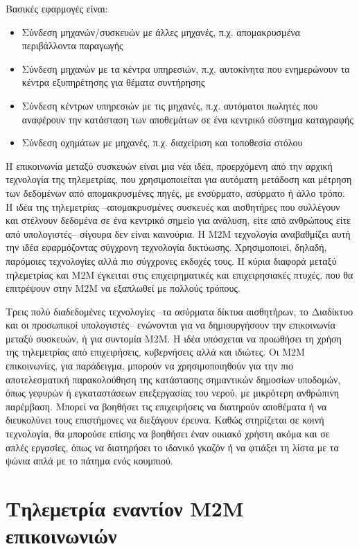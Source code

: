 \documentclass[12pt, a4paper, oneside]{report}
\begin{document}
Βασικές εφαρμογές είναι:
\begin{itemize}
\item Σύνδεση μηχανών\slash συσκευών με άλλες μηχανές, π.χ. απομακρυσμένα περιβάλλοντα παραγωγής
\item Σύνδεση μηχανών με τα κέντρα υπηρεσιών, π.χ. αυτοκίνητα που ενημερώνουν τα κέντρα εξυπηρέτησης για θέματα συντήρησης
\item Σύνδεση κέντρων υπηρεσιών με τις μηχανές, π.χ. αυτόματοι πωλητές που αναφέρουν την κατάσταση των αποθεμάτων σε ένα κεντρικό σύστημα καταγραφής
\item Σύνδεση οχημάτων με μηχανές, π.χ. διαχείριση και τοποθεσία στόλου
\end{itemize}
Η επικοινωνία μεταξύ συσκευών είναι μια νέα ιδέα, προερχόμενη από την αρχική τεχνολογία της τηλεμετρίας, που χρησιμοποιείται για αυτόματη μετάδοση και μέτρηση των δεδομένων από απομακρυσμένες πηγές, με ενσύρματο, ασύρματο ή άλλο τρόπο. Η ιδέα της τηλεμετρίας –απομακρυσμένες συσκευές και αισθητήρες που συλλέγουν και στέλνουν δεδομένα σε ένα κεντρικό σημείο για ανάλυση, είτε από ανθρώπους είτε από υπολογιστές– σίγουρα δεν είναι καινούρια. Η Μ2Μ τεχνολογία αναβαθμίζει αυτή την ιδέα εφαρμόζοντας σύγχρονη τεχνολογία δικτύωσης. Χρησιμοποιεί, δηλαδή, παρόμοιες τεχνολογίες αλλά πιο σύγχρονες εκδοχές τους. Η κύρια διαφορά μεταξύ τηλεμετρίας και Μ2Μ έγκειται στις επιχειρηματικές και επιχειρησιακές πτυχές, που θα επιτρέψουν στην Μ2Μ να εξαπλωθεί με πολλούς τρόπους.

Τρεις πολύ διαδεδομένες τεχνολογίες –τα ασύρματα δίκτυα αισθητήρων, το Διαδίκτυο και οι προσωπικοί υπολογιστές– ενώνονται για να δημιουργήσουν την επικοινωνία μεταξύ συσκευών, ή για συντομία Μ2Μ. Η ιδέα υπόσχεται να προωθήσει τη χρήση της τηλεμετρίας από επιχειρήσεις, κυβερνήσεις αλλά και ιδιώτες. Οι Μ2Μ επικοινωνίες, για παράδειγμα, μπορούν να χρησιμοποιηθούν για την πιο αποτελεσματική παρακολούθηση της κατάστασης σημαντικών δημοσίων υποδομών, όπως γεφυρών ή εγκαταστάσεων επεξεργασίας του νερού, με μικρότερη ανθρώπινη παρέμβαση. Μπορεί να βοηθήσει τις επιχειρήσεις να διατηρούν αποθέματα ή να διευκολύνει τους επιστήμονες να διεξάγουν έρευνα. Καθώς στηρίζεται σε κοινή τεχνολογία, θα μπορούσε επίσης να βοηθήσει έναν οικιακό χρήστη ακόμα και σε απλές εργασίες, όπως να διατηρήσει το ιδανικό γκαζόν ή να φτιάξει τη λίστα με τα ψώνια απλά με το πάτημα ενός κουμπιού.

\section{Τηλεμετρία εναντίον M2M επικοινωνιών}
\end{document}
